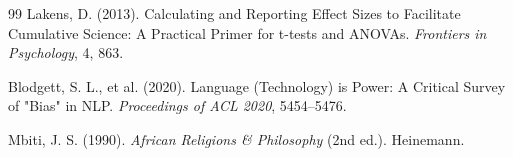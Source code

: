 \documentclass[a4paper,11pt]{article}
\begin{document}
\begin{thebibliography}{99}
Lakens, D. (2013). Calculating and Reporting Effect Sizes to Facilitate Cumulative Science: A Practical Primer for t-tests and ANOVAs. \textit{Frontiers in Psychology}, 4, 863.

Blodgett, S. L., et al. (2020). Language (Technology) is Power: A Critical Survey of "Bias" in NLP. \textit{Proceedings of ACL 2020}, 5454–5476.

Mbiti, J. S. (1990). \textit{African Religions \& Philosophy} (2nd ed.). Heinemann.

\end{thebibliography}
\end{document}
